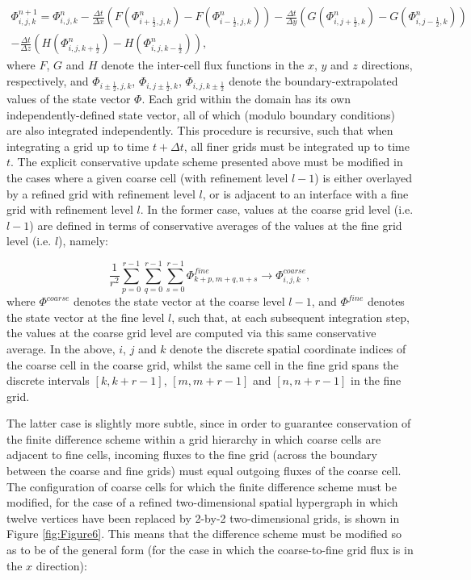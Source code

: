 \documentclass{article}
\begin{document}
\begin{multline}
\Phi_{i, j, k}^{n + 1} = \Phi_{i, j, k}^{n} - \frac{\Delta t}{\Delta x} \left( F \left( \Phi_{i + \frac{1}{2}, j, k}^{n} \right) - F \left( \Phi_{i - \frac{1}{2}, j, k}^{n} \right) \right) - \frac{\Delta t}{\Delta y} \left( G \left( \Phi_{i, j + \frac{1}{2}, k}^{n} \right) - G \left( \Phi_{i, j - \frac{1}{2}, k}^{n} \right) \right)\\
- \frac{\Delta t}{\Delta z} \left( H \left( \Phi_{i, j, k + \frac{1}{2}}^{n} \right) - H \left( \Phi_{i, j, k - \frac{1}{2}}^{n} \right) \right),
\end{multline}
where $F$, $G$ and $H$ denote the inter-cell flux functions in the $x$, $y$ and $z$ directions, respectively, and ${\Phi_{i \pm \frac{1}{2}, j, k}}$, ${\Phi_{i, j \pm \frac{1}{2}, k}}$, ${\Phi_{i, j, k \pm \frac{1}{2}}}$ denote the boundary-extrapolated values of the state vector ${\Phi}$. Each grid within the domain has its own independently-defined state vector, all of which (modulo boundary conditions) are also integrated independently. This procedure is recursive, such that when integrating a grid up to time ${t + \Delta t}$, all finer grids must be integrated up to time $t$. The explicit conservative update scheme presented above must be modified in the cases where a given coarse cell (with refinement level ${l - 1}$) is either overlayed by a refined grid with refinement level $l$, or is adjacent to an interface with a fine grid with refinement level $l$. In the former case, values at the coarse grid level (i.e. ${l - 1}$) are defined in terms of conservative averages of the values at the fine grid level (i.e. $l$), namely:

\begin{equation}
\frac{1}{r^2} \sum_{p = 0}^{r - 1} \sum_{q = 0}^{r - 1} \sum_{s = 0}^{r - 1} \Phi_{k + p, m + q, n + s}^{fine} \to \Phi_{i, j, k}^{coarse},
\end{equation}
where ${\Phi^{coarse}}$ denotes the state vector at the coarse level ${l - 1}$, and ${\Phi^{fine}}$ denotes the state vector at the fine level $l$, such that, at each subsequent integration step, the values at the coarse grid level are computed via this same conservative average. In the above, $i$, $j$ and $k$ denote the discrete spatial coordinate indices of the coarse cell in the coarse grid, whilst the same cell in the fine grid spans the discrete intervals ${\left[ k, k + r - 1 \right]}$, ${\left[ m, m + r - 1 \right]}$ and ${\left[ n, n + r - 1 \right]}$ in the fine grid.

The latter case is slightly more subtle, since in order to guarantee conservation of the finite difference scheme within a grid hierarchy in which coarse cells are adjacent to fine cells, incoming fluxes to the fine grid (across the boundary between the coarse and fine grids) must equal outgoing fluxes of the coarse cell. The configuration of coarse cells for which the finite difference scheme must be modified, for the case of a refined two-dimensional spatial hypergraph in which twelve vertices have been replaced by 2-by-2 two-dimensional grids, is shown in Figure \ref{fig:Figure6}. This means that the difference scheme must be modified so as to be of the general form (for the case in which the coarse-to-fine grid flux is in the $x$ direction):
\end{document}
